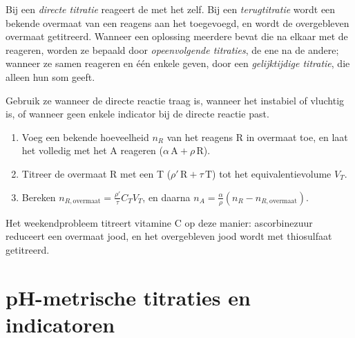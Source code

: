 \begin{definition}\label{def:b1:titration-methods:kinds}
Bij een \emph{directe titratie} reageert de
 met het  zelf. Bij een
\emph{terugtitratie} wordt een bekende overmaat van
een reagens aan het  toegevoegd, en wordt de overgebleven
overmaat getitreerd. Wanneer een oplossing meerdere  bevat die
na elkaar met de  reageren, worden ze bepaald door
\emph{opeenvolgende titraties}, de ene
 na de andere; wanneer ze samen reageren en één enkele
 geven, door een \emph{gelijktijdige
titratie}, die alleen hun som geeft.
\end{definition}

\begin{method}[Terugtitratie]\label{met:b1:titration-methods:back-titration}
Gebruik ze wanneer de directe reactie traag is, wanneer het 
instabiel of vluchtig is, of wanneer geen enkele indicator bij de directe
reactie past.
\begin{enumerate}
  \item Voeg een bekende hoeveelheid $n_R$ van het reagens R in overmaat
        toe, en laat het volledig met het  A reageren
        ($\alpha\,\mathrm{A} + \rho\,\mathrm{R}$).
  \item Titreer de overmaat R met een  T ($\rho'\,\mathrm{R} +
        \tau\,\mathrm{T}$) tot het equivalentievolume $V_T$.
  \item Bereken $n_{R,\text{overmaat}} = \frac{\rho'}{\tau}C_TV_T$, en
        daarna $n_A = \frac{\alpha}{\rho}(n_R - n_{R,\text{overmaat}})$.
\end{enumerate}
\end{method}

Het weekendprobleem titreert vitamine C op deze manier: ascorbinezuur
reduceert een overmaat jood, en het overgebleven jood wordt met
thiosulfaat getitreerd.

\section{pH-metrische titraties en indicatoren}

